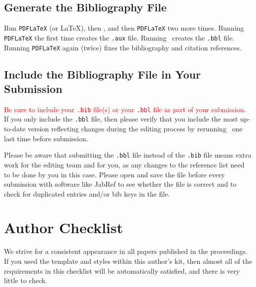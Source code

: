 \documentclass{scspaperproc}
\theoremstyle{scsthe}
\begin{document}




    \subsection{Generate the Bibliography File}

    Run \texttt{PDFLaTeX} (or \LaTeX), then \BibTeX, and then \texttt{PDFLaTeX} two more times. Running \texttt{PDFLaTeX} the first time creates the \texttt{.aux} file. Running \BibTeX\ creates the \texttt{.bbl} file.  Running \texttt{PDFLaTeX} again (twice) fixes the bibliography and citation references.


    \subsection{Include the Bibliography File in Your Submission}
    \label{sec:submitbib}

    \textcolor{red}{Be sure to include your \texttt{.bib} file(s) or your \texttt{.bbl} file as part of your submission}. If you only include the \texttt{.bbl} file, then please verify that you include the most up-to-date version reflecting changes during the editing process by rerunning \BibTeX\ one last time before submission.

    Please be aware that submitting the \texttt{.bbl} file instead of the \texttt{.bib} file means extra work for the editing team and for you, as any changes to the reference list need to be done by you in this case.
    Please open and save the file before every submission with software like JabRef to see whether the file is correct and to check for duplicated entries and/or bib keys in the file.


    \section{Author Checklist}
    We strive for a consistent appearance in all papers published in the proceedings. If you used the template and styles within this author’s kit, then almost all of the requirements in this checklist will be automatically satisfied, and there is very little to check.
\end{document}
